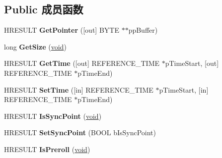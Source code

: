 \subsection*{Public 成员函数}
\begin{DoxyCompactItemize}
\item 
\mbox{\label{interface_i_media_sample_ac01cb8180ae32914938c7989e1c21201}} 
H\+R\+E\+S\+U\+LT {\bfseries Get\+Pointer} (\mbox{[}out\mbox{]} B\+Y\+TE $\ast$$\ast$pp\+Buffer)
\item 
\mbox{\label{interface_i_media_sample_a710d648cd63d426a0b7700b68c1622d1}} 
long {\bfseries Get\+Size} (\hyperlink{interfacevoid}{void})
\item 
\mbox{\label{interface_i_media_sample_a1e062cb8d88a1a84d94c845559ede549}} 
H\+R\+E\+S\+U\+LT {\bfseries Get\+Time} (\mbox{[}out\mbox{]} R\+E\+F\+E\+R\+E\+N\+C\+E\+\_\+\+T\+I\+ME $\ast$p\+Time\+Start, \mbox{[}out\mbox{]} R\+E\+F\+E\+R\+E\+N\+C\+E\+\_\+\+T\+I\+ME $\ast$p\+Time\+End)
\item 
\mbox{\label{interface_i_media_sample_a07195bd1726eba3c1802a6195d88d4bf}} 
H\+R\+E\+S\+U\+LT {\bfseries Set\+Time} (\mbox{[}in\mbox{]} R\+E\+F\+E\+R\+E\+N\+C\+E\+\_\+\+T\+I\+ME $\ast$p\+Time\+Start, \mbox{[}in\mbox{]} R\+E\+F\+E\+R\+E\+N\+C\+E\+\_\+\+T\+I\+ME $\ast$p\+Time\+End)
\item 
\mbox{\label{interface_i_media_sample_a735feb109f80c88315e12fb57b377962}} 
H\+R\+E\+S\+U\+LT {\bfseries Is\+Sync\+Point} (\hyperlink{interfacevoid}{void})
\item 
\mbox{\label{interface_i_media_sample_a4b9a3948ebfc4ed5da81c5ab656c83e5}} 
H\+R\+E\+S\+U\+LT {\bfseries Set\+Sync\+Point} (B\+O\+OL b\+Is\+Sync\+Point)
\item 
\mbox{\label{interface_i_media_sample_aa6ab65f00358a848f49590e1ac7c4f36}} 
H\+R\+E\+S\+U\+LT {\bfseries Is\+Preroll} (\hyperlink{interfacevoid}{void})
\item 
\mbox{\label{interface_i_media_sample_adaf61516d0d0f1a53e1e0d1130b8d44e}} 
$$
\end{DoxyCompactItemize}
